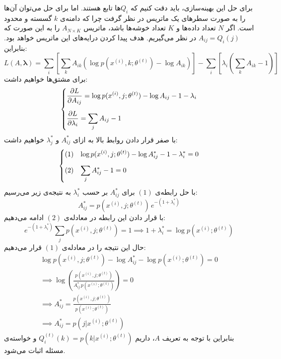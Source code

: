 \documentclass[a4paper, 12pt]{article}
\begin{document}
\begin{enumerate}
\[	\]
	برای حل این بهینه‌سازی، باید دقت کنیم که $Q_i$ها تابع هستند. اما برای حل می‌توان آن‌ها را به صورت سطرهای یک ماتریس در نظر گرفت چرا که دامنه‌ی $k$ گسسته و محدود است. اگر $N$‌ تعداد داده‌ها و $K$ تعداد خوشه‌ها باشد، ماتریس
	$A_{N\times K}$
	را به این صورت که 
	$A_{ij} = Q_i(j)$
	در نظر می‌گیریم. هدف پیدا کردن درایه‌های این ماتریس خواهد بود. بنابراین:
	\[
	L(A, \bm{\lambda}) = \sum_i\left[\sum_k A_{ik} \left(\log p(x^{(i)}, k; \theta^{(t)}) - \log A_{ik}\right) \right] - \sum_i\left[ \lambda_i\left(\sum_k A_{ik} - 1\right)\right]
	\]
	برای مشتق‌ها خواهیم داشت:
	\[
	\begin{dcases}
		\frac{\partial L}{\partial A_{ij}} = \log p(x^{(i)}, j; \theta^{(t)}) - \log A_{ij} - 1 - \lambda_i \\[0.5em]
		\frac{\partial L}{\partial \lambda_i} = \sum_j A_{ij} - 1
	\end{dcases}
	\]
	با صفر قرار دادن روابط بالا به ازای 
	$A^\ast_{ij}$
	و
	$\lambda^\ast_j$
	خواهیم داشت:
	\[
	\begin{dcases}
		(1) &\log p(x^{(i)}, j; \theta^{(t)}) - \log A^\ast_{ij} - 1 - \lambda^\ast_i = 0 \\[0.5em]
		(2) &\sum_j A^\ast_{ij} - 1 = 0
	\end{dcases}
	\]
	با حل رابطه‌ی $(1)$ برای
	$A^\ast_{ij}$
	بر حسب 
	$\lambda^\ast_i$
	به نتیجه‌ی زیر می‌رسیم:
	\[
	A^\ast_{ij} = p(x^{(i)}, j; \theta^{(t)}) \, e^{-(1+\lambda^\ast_i)}
	\]
	با قرار دادن این رابطه در معادله‌ی $(2)$ ادامه می‌دهیم:
	\[
	e^{-(1+\lambda^\ast_i)} \sum_j p(x^{(i)}, j; \theta^{(t)}) = 1 \implies 1+\lambda^\ast_i = \log p(x^{(i)}; \theta^{(t)}) 
	\]
	حال این نتیجه را در معادله‌ی $(1)$ قرار می‌دهیم:
	\[
	\begin{gathered}
		\log  p(x^{(i)}, j; \theta^{(t)}) - \log A^\ast_{ij} - \log p(x^{(i)}; \theta^{(t)})  = 0 \\[0.5em]
		\implies \log \left(\frac{p(x^{(i)}, j; \theta^{(t)})}{A^\ast_{ij}\,p(x^{(i)}; \theta^{(t)})}\right) = 0 \\[0.5em]
		\implies A^\ast_{ij} = \frac{p(x^{(i)}, j; \theta^{(t)})}{p(x^{(i)}; \theta^{(t)})} \\[0.5em]
		\implies \boxed{A^\ast_{ij} = p(j|x^{(i)}; \theta^{(t)})}
	\end{gathered}
	\]
	بنابراین با توجه به تعریف $A$، داریم 
	$Q^{(t)}_i(k) = p(k|x^{(i)}; \theta^{(t)})$
	و خواسته‌ی مسئله اثبات می‌شود.
\end{enumerate}

\pagebreak
\end{document}
